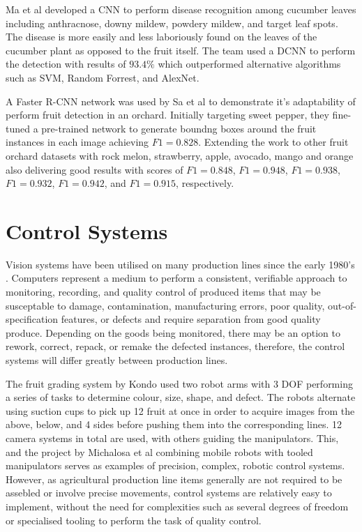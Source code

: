 \documentclass[fleqn,twoside,12pt]{report}
\begin{document}
Ma et al \cite{ma} developed a CNN to perform disease recognition among cucumber leaves including anthracnose, downy mildew, powdery mildew, and target leaf spots. The disease is more easily and less laboriously found on the leaves of the cucumber plant as opposed to the fruit itself. The team used a DCNN to perform the detection with results of $93.4\%$ which outperformed alternative algorithms such as SVM, Random Forrest, and AlexNet.

   
A Faster R-CNN network was used by Sa et al \cite{sa} to demonstrate it's adaptability of perform fruit detection in an orchard. Initially targeting sweet pepper, they fine-tuned a pre-trained network to generate boundng boxes around the fruit instances in each image achieving $F1=0.828$. Extending the work to other fruit orchard datasets with rock melon, strawberry, apple, avocado, mango and orange also delivering good results with scores of $F1=0.848$, $F1=0.948$, $F1=0.938$, $F1=0.932$, $F1=0.942$, and $F1=0.915$, respectively. 




\section{Control Systems}
\label{sec:control_sys}

Vision systems have been utilised on many production lines since the early 1980's \cite{kruger}. Computers represent a medium to perform a consistent, verifiable approach to monitoring, recording, and quality control of produced items that may be susceptable to damage, contamination, manufacturing errors, poor quality, out-of-specification features, or defects and require separation from good quality produce. Depending on the goods being monitored, there may be an option to rework, correct, repack, or remake the defected instances, therefore, the control systems will differ greatly between production lines.   

The fruit grading system by Kondo \cite{kondo} used two robot arms with 3 DOF performing a series of tasks to determine colour, size, shape, and defect. The robots alternate using suction cups to pick up 12 fruit at once in order to acquire images from the above, below, and 4 sides before pushing them into the corresponding lines. 12 camera systems in total are used, with others guiding the manipulators. This, and the project by Michalosa et al \cite{michalosa} combining mobile robots with tooled manipulators serves as examples of precision, complex, robotic control systems. However, as agricultural production line items generally are not required to be assebled or involve precise movements, control systems are relatively easy to implement, without the need for complexities such as several degrees of freedom or specialised tooling to perform the task of quality control.  
\end{document}
